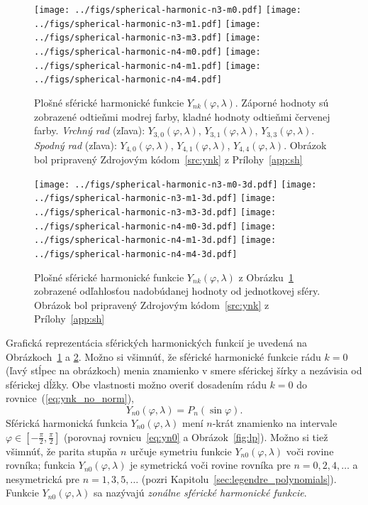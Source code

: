 \documentclass[a4paper, 12pt]{book}
\begin{document}
\begin{figure}[bt]
\centering
\texttt{[image: ../figs/spherical-harmonic-n3-m0.pdf]}
\texttt{[image: ../figs/spherical-harmonic-n3-m1.pdf]}
\texttt{[image: ../figs/spherical-harmonic-n3-m3.pdf]}
\texttt{[image: ../figs/spherical-harmonic-n4-m0.pdf]}
\texttt{[image: ../figs/spherical-harmonic-n4-m1.pdf]}
\texttt{[image: ../figs/spherical-harmonic-n4-m4.pdf]}
\caption{Plošné sférické harmonické funkcie $Y_{nk}(\varphi, \lambda)$.  
Záporné hodnoty sú zobrazené odtieňmi modrej farby, kladné hodnoty odtieňmi 
červenej farby.  \textit{Vrchný rad} (zľava): $Y_{3,0}(\varphi, \lambda)$, 
$Y_{3,1}(\varphi, \lambda)$, $Y_{3,3}(\varphi, \lambda)$.  \textit{Spodný rad} 
(zľava): $Y_{4,0}(\varphi, \lambda)$, $Y_{4,1}(\varphi, \lambda)$, 
$Y_{4,4}(\varphi, \lambda)$.  Obrázok bol pripravený Zdrojovým 
kódom~\ref{src:ynk} z Prílohy~\ref{app:sh}}
\label{fig:sh}
\end{figure}

\begin{figure}[bt]
\centering
\texttt{[image: ../figs/spherical-harmonic-n3-m0-3d.pdf]}
\texttt{[image: ../figs/spherical-harmonic-n3-m1-3d.pdf]}
\texttt{[image: ../figs/spherical-harmonic-n3-m3-3d.pdf]}
\texttt{[image: ../figs/spherical-harmonic-n4-m0-3d.pdf]}
\texttt{[image: ../figs/spherical-harmonic-n4-m1-3d.pdf]}
\texttt{[image: ../figs/spherical-harmonic-n4-m4-3d.pdf]}
\caption{Plošné sférické harmonické funkcie $Y_{nk}(\varphi, \lambda)$ 
z Obrázku~\ref{fig:sh} zobrazené odľahlosťou nadobúdanej hodnoty od jednotkovej 
sféry.  Obrázok bol pripravený Zdrojovým kódom~\ref{src:ynk} 
z Prílohy~\ref{app:sh}}
\label{fig:sh3d}
\end{figure}

Grafická reprezentácia sférických harmonických funkcií je uvedená na 
Obrázkoch~\ref{fig:sh} a \ref{fig:sh3d}.  Možno si všimnúť, že sférické 
harmonické funkcie rádu $k = 0$ (ľavý stĺpec na obrázkoch) menia znamienko 
v smere sférickej šírky a nezávisia od sférickej dĺžky.  Obe vlastnosti možno 
overiť dosadením rádu $k = 0$ do rovnice~(\ref{eq:ynk_no_norm}),
%
\begin{equation}
\label{eq:yn0}
Y_{n0}(\varphi, \lambda) = P_n(\sin\varphi){.}
\end{equation}
%
Sférická harmonická funkcia $Y_{n0}(\varphi, \lambda)$ mení $n$-krát znamienko 
na intervale $\varphi \in [-\frac{\pi}{2}, \frac{\pi}{2}]$ (porovnaj 
rovnicu~\ref{eq:yn0} a Obrázok~\ref{fig:lp}).  Možno si tiež všimnúť, že parita 
stupňa $n$ určuje symetriu funkcie $Y_{n0}(\varphi, \lambda)$ voči rovine 
rovníka; funkcia $Y_{n0}(\varphi, \lambda)$ je symetrická voči rovine rovníka 
pre $n = 0, 2, 4, \dots$ a nesymetrická pre $n = 1, 3, 5, \dots$ (pozri 
Kapitolu~\ref{sec:legendre_polynomials}). Funkcie $Y_{n0}(\varphi, \lambda)$ sa 
nazývajú \emph{zonálne sférické harmonické funkcie}.
\end{document}
